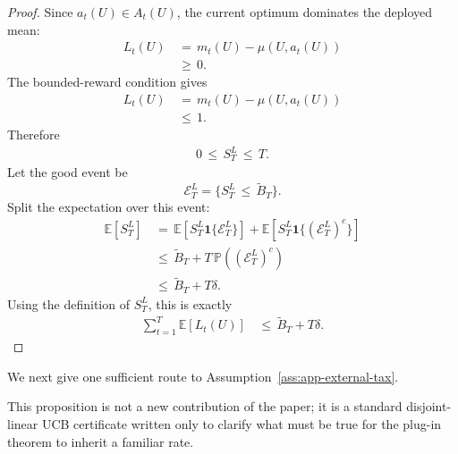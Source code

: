 \documentclass{article} %
\begin{document}
\begin{proof}
Since \(a_t(U)\in A_t(U)\), the current optimum dominates the deployed mean:
\begin{align}
\label{eq:app-tax-nonnegative}
L_t(U)
&\,=\,
m_t(U)-\mu(U,a_t(U))
\\
&\,\ge\,
0.
\end{align}
The bounded-reward condition gives
\begin{align}
\label{eq:app-tax-upper}
L_t(U)
&\,=\,
m_t(U)-\mu(U,a_t(U))
\\
&\,\le\,
1.
\end{align}
Therefore
\begin{align}
\label{eq:app-cumulative-tax-range}
0
\,\le\,
S_T^{L}
\,\le\,
T.
\end{align}
Let the good event be
\begin{equation}
\label{eq:app-tax-good-event}
\mathcal{E}_T^{L}
=
\{S_T^{L}\,\le\, \widetilde{B}_T\}.
\end{equation}
Split the expectation over this event:
\begin{align}
\label{eq:app-tax-split}
\mathbb{E}[S_T^{L}]
&\,=\,
\mathbb{E}[S_T^{L}\mathbf{1}\{\mathcal{E}_T^{L}\}]
+
\mathbb{E}[S_T^{L}\mathbf{1}\{(\mathcal{E}_T^{L})^c\}]
\\
&\,\le\,
\widetilde{B}_T
+
T\,\mathbb{P}((\mathcal{E}_T^{L})^c)
\\
&\,\le\,
\widetilde{B}_T
+
T\delta.
\end{align}
Using the definition of \(S_T^{L}\), this is exactly
\begin{align}
\label{eq:app-tax-expectation-final}
\sum_{t=1}^{T}\mathbb{E}[L_t(U)]
&\,\le\,
\widetilde{B}_T+T\delta.
\end{align}
\end{proof}

We next give one sufficient route to Assumption~\ref{ass:app-external-tax}.

This proposition is not a new contribution of the paper; it is a standard disjoint-linear UCB certificate written only to clarify what must be true for the plug-in theorem to inherit a familiar rate.
\end{document}
